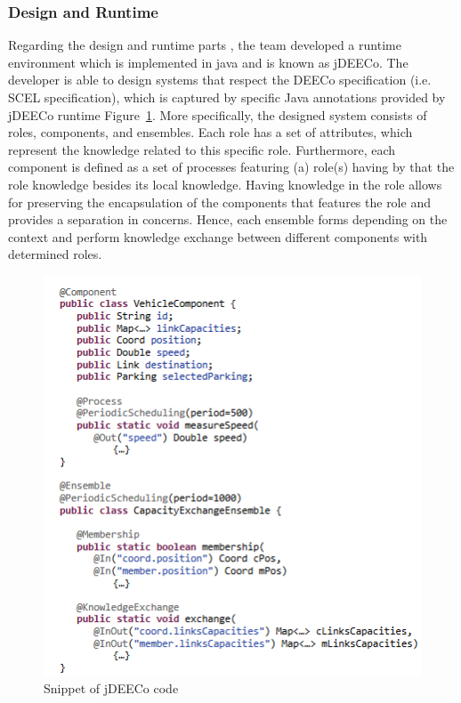 \subsubsection{Design and Runtime}

Regarding the design and runtime parts \cite{Bures:2013:DEC:2465449.2465462}\cite{AlAli:2014:DEC:2591062.2591140} , the team developed a runtime environment which is implemented in java and is known as jDEECo. The developer is able to design systems that respect the DEECo specification (i.e. SCEL specification), which is captured by specific Java annotations provided by jDEECo runtime Figure~\ref{fig:deeco_code}. More specifically, the designed system consists of roles, components, and ensembles. Each role has a set of attributes, which represent the knowledge related to this specific role. Furthermore, each component is defined as a set of processes featuring (a) role(s) having by that the role knowledge besides its local knowledge. Having knowledge in the role allows for preserving the encapsulation of the components that features the role and provides a separation in concerns. Hence, each ensemble forms depending on the context and perform knowledge exchange between different components with determined roles. 

\begin{figure}[!h]
\centering
\includegraphics[scale=0.80]{figures/deeco_code}
\caption{Snippet of jDEECo code}
\label{fig:deeco_code}
\end{figure}


